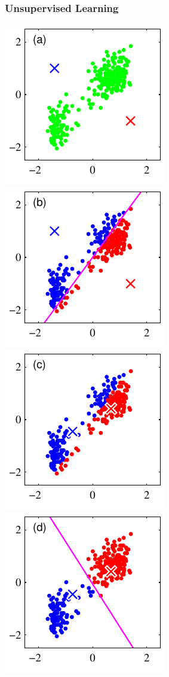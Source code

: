 \documentclass[aspectratio=169,xcolor=dvipsnames,svgnames,x11names,fleqn]{beamer}
\begin{document}
 \begin{frame}
   \frametitle{Unsupervised Learning}
    \begin{center}
    \includegraphics[scale=.4]{figures/Figure91a.pdf}
    \includegraphics[scale=.4]{figures/Figure91b.pdf}
    \includegraphics[scale=.4]{figures/Figure91c.pdf} \\
    \includegraphics[scale=.4]{figures/Figure91d.pdf}

\end{center}
\end{frame}
\end{document}
